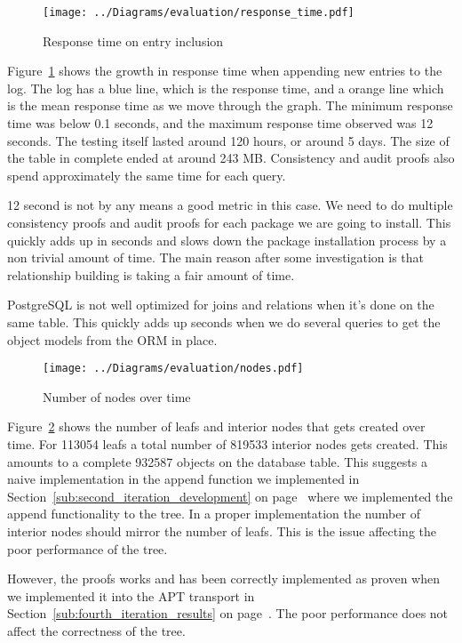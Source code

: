 \documentclass[../Main/thesis.tex]{subfiles}
\begin{document}
\begin{figure}[H]
\centering
\texttt{[image: ../Diagrams/evaluation/response\_time.pdf]}
\caption{Response time on entry inclusion}
\label{fig:response_time}
\end{figure}

Figure~\ref{fig:response_time} shows the growth in response time when appending
new entries to the log. The log has a blue line, which is the response time, and
a orange line which is the mean response time as we move through the graph. The
minimum response time was below 0.1 seconds, and the maximum response time
observed was 12 seconds. The testing itself lasted around 120 hours, or around 5
days. The size of the table in complete ended at around 243 MB. Consistency and
audit proofs also spend approximately the same time for each query.

12 second is not by any means a good metric in this case. We need to do multiple
consistency proofs and audit proofs for each package we are going to install.
This quickly adds up in seconds and slows down the package installation process
by a non trivial amount of time. The main reason after some investigation is
that relationship building is taking a fair amount of time.

PostgreSQL is not well optimized for joins and relations when it's done on the
same table. This quickly adds up seconds when we do several queries to get the
object models from the ORM in place.

\begin{figure}[H]
\centering
\texttt{[image: ../Diagrams/evaluation/nodes.pdf]}
\caption{Number of nodes over time}
\label{fig:nodes_figure}
\end{figure}

Figure~\ref{fig:nodes_figure} shows the number of leafs and interior nodes that
gets created over time. For 113054 leafs a total number of 819533 interior nodes
gets created. This amounts to a complete 932587 objects on the database table.
This suggests a naive implementation in the append function we implemented
in Section~\ref{sub:second_iteration_development} on
page~\pageref{sub:second_iteration_development} where we implemented the append
functionality to the tree. In a proper implementation the number of interior
nodes should mirror the number of leafs. This is the issue affecting the poor
performance of the tree.

However, the proofs works and has been correctly implemented as proven when we
implemented it into the APT transport in Section~\ref{sub:fourth_iteration_results} on
page~\pageref{sub:fourth_iteration_results}. The poor performance does not
affect the correctness of the tree.

\blankpage
\end{document}

